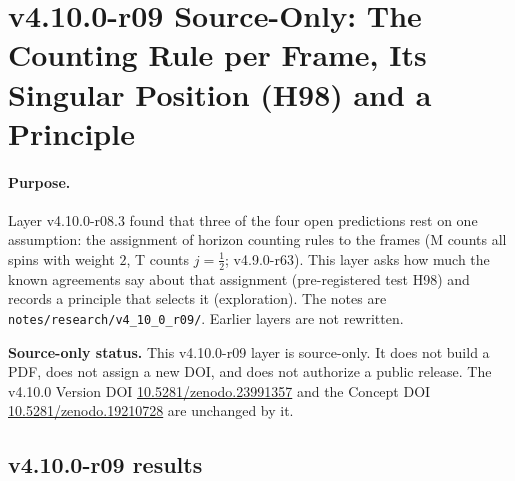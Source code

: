 \clearpage
\section*{v4.10.0-r09 Source-Only: The Counting Rule per Frame, Its Singular Position (H98) and a Principle}
\label{sec:v4100-r09-counting-rule}

\paragraph{Purpose.}
Layer v4.10.0-r08.3 found that three of the four open predictions rest on one assumption: the assignment of horizon counting rules to the frames
(M counts all spins with weight \(2\), T counts \(j=\tfrac12\); v4.9.0-r63).  This layer asks how much the known agreements say about that assignment
(pre-registered test H98) and records a principle that selects it (exploration).  The notes are \texttt{notes/\allowbreak research/\allowbreak v4\_10\_0\_r09/}.
Earlier layers are not rewritten.

\noindent\textbf{Source-only status.}
This v4.10.0-r09 layer is source-only.  It does not build a PDF, does not assign a new DOI,
and does not authorize a public release.  The v4.10.0 Version DOI
\href{https://doi.org/10.5281/zenodo.23991357}{10.5281/zenodo.23991357} and the Concept DOI
\href{https://doi.org/10.5281/zenodo.19210728}{10.5281/zenodo.19210728} are unchanged by it.

\subsection*{v4.10.0-r09 results}
\label{subsec:v4100-r09-results}

